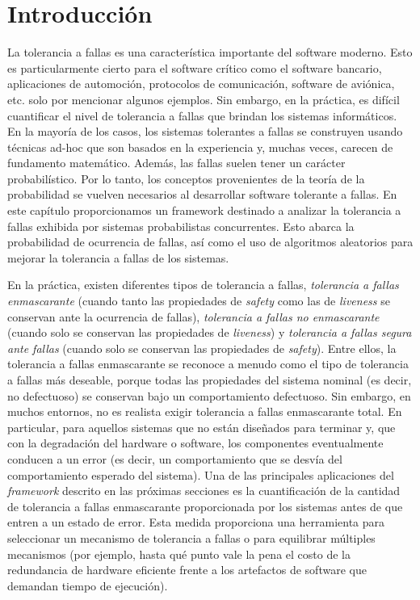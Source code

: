 \section{Introducción} \label{sec:intro_prob}

La tolerancia a fallas es una característica importante del software moderno. Esto es particularmente cierto para el software crítico como el software bancario,
aplicaciones de automoción, protocolos de comunicación, software de aviónica, etc.
solo por mencionar algunos ejemplos.
Sin embargo, en la práctica, es difícil cuantificar el nivel de tolerancia a fallas que brindan los sistemas informáticos. En la mayoría de los casos, los sistemas tolerantes a fallas se construyen usando técnicas ad-hoc que son basados en la experiencia y, muchas veces, carecen de fundamento matemático.
Además, las fallas suelen tener un carácter probabilístico. Por lo tanto, los conceptos provenientes de la teoría de la probabilidad se vuelven necesarios al desarrollar software tolerante a fallas. En este capítulo proporcionamos un framework destinado a analizar la tolerancia a fallas exhibida por sistemas probabilistas concurrentes. Esto abarca la probabilidad de ocurrencia de fallas, así como el uso de algoritmos aleatorios para mejorar la tolerancia a fallas de los sistemas.

 En la práctica, existen diferentes tipos de tolerancia a fallas, \emph{tolerancia a fallas enmascarante} (cuando tanto las propiedades de \textit{safety} como las de \textit{liveness} se conservan ante la ocurrencia de fallas),
\emph{tolerancia a fallas no enmascarante} (cuando solo se conservan las propiedades de \textit{liveness}) y \emph{tolerancia a fallas segura ante fallas} (cuando solo se conservan las propiedades de \textit{safety}).
Entre ellos, la tolerancia a fallas enmascarante se reconoce a menudo como el tipo de tolerancia a fallas más deseable, porque todas las propiedades del sistema nominal (es decir, no defectuoso) se conservan bajo un comportamiento defectuoso.
Sin embargo, en muchos entornos, no es realista exigir tolerancia a fallas enmascarante total. En particular, para aquellos sistemas que no están diseñados para terminar y, que con la degradación del hardware o software, los componentes eventualmente conducen a un error (es decir, un comportamiento que se desvía del comportamiento esperado del sistema). Una de las principales aplicaciones del \textit{framework} descrito en las próximas secciones es la cuantificación de la
 cantidad de tolerancia a fallas enmascarante proporcionada por los sistemas antes de que entren a un estado de error. Esta medida proporciona una herramienta para seleccionar un mecanismo de tolerancia a fallas o para equilibrar múltiples mecanismos (por ejemplo, hasta qué punto vale la pena el costo de la redundancia de hardware eficiente frente a los artefactos de software que demandan tiempo de ejecución).
	
